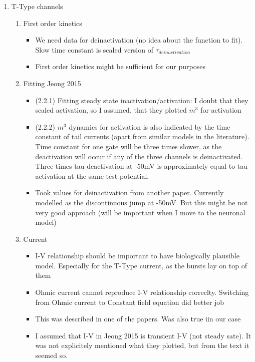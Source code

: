 \documentclass[11pt]{article}
\begin{document}
\begin{enumerate}
    \item T-Type channels
    \begin{enumerate}
        \item First order kinetics
        \begin{itemize}
            \item We need data for deinactivation (no idea about the function to fit). Slow time
            constant is scaled version of $\tau_{deinactivation}$
            \item First order kinetics might be sufficient for our purposes
        \end{itemize}
        
        \item Fitting Jeong 2015
        \begin{itemize}
            \item (2.2.1) Fitting steady state inactivation/activation: I doubt that they scaled
            activation, so I assumed, that they plotted $m^3$ for activation
            \item (2.2.2) $m^3$ dynamics for activation is also indicated by the time constant
            of tail currents (apart from similar models in the literature). Time constant for
            one gate will be three times slower, as the deactivation will occur if any of the
            three channels is deinactivated. Three times tau deactivation at -50mV is approximately
            equal to tau activation at the same test potential.
            \item Took values for deinactivation from another paper. Currently modelled as the
            discontinuous jump at -50mV. But this might be not very good approach
            (will be important when I move to the neuronal model)
        \end{itemize}

        \item Current
        \begin{itemize}
            \item I-V relationship should be important to have biologically plausible model.
            Especially for the T-Type current, as the bursts lay on top of them
            \item Ohmic current cannot reproduce I-V relationship correclty. Switching from Ohmic
            current to Constant field equation did better job
            \item This was described in one of the papers. Was also true iin our case
            \item I assumed that I-V in Jeong 2015 is transient I-V (not steady sate). It was not
            explicitely mentioned what they plotted, but from the text it seemed so.
        \end{itemize}


\end{enumerate}
\end{enumerate}
\end{document}
